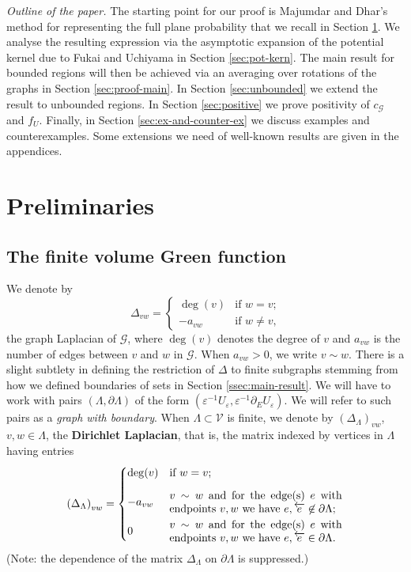 \documentclass[11pt]{article}
\theoremstyle{remark}
\def\eps{\varepsilon}
\def\cG{\mathcal{G}}
\def\cV{\mathcal{V}}
\newcommand{\eqnst}[1]{\begin{equation*}#1\end{equation*}}
\begin{document}
\emph{Outline of the paper.} 
The starting point for our proof is Majumdar and Dhar's method \cite{Majumdar1992,Dhar1991} 
for representing the full plane probability that we recall in Section \ref{sec:prelim}. 
We analyse the resulting expression via the asymptotic 
expansion of the potential kernel due to Fukai and Uchiyama \cite{FU96} in 
Section \ref{sec:pot-kern}.
The main result for bounded regions will then be achieved via an averaging over 
rotations of the graphs in Section \ref{sec:proof-main}. In Section \ref{sec:unbounded} 
we extend the result to unbounded regions. In Section \ref{sec:positive} we prove positivity
of $c_\cG$ and $f_U$. Finally, in Section \ref{sec:ex-and-counter-ex} 
we discuss examples and counterexamples. Some extensions we need of well-known results 
are given in the appendices.


\section{Preliminaries}
\label{sec:prelim}


\subsection{The finite volume Green function}
\label{ssec:finite-Green}
We denote by 
\eqnst{
  \Delta_{vw}
  = \begin{cases}
    \deg(v) & \text{if $w = v$;} \\
    - a_{vw} & \text{if $w \not= v$,}
  \end{cases} }
the graph Laplacian of $\cG$, where $\deg(v)$ denotes the degree of $v$ and $a_{vw}$ 
is the number of edges between $v$ and $w$ in $\cG$. When $a_{vw} > 0$, we write $v \sim w$.
There is a slight subtlety in defining the restriction of $\Delta$ to finite subgraphs
stemming from how we defined boundaries of sets in Section \ref{ssec:main-result}. 
We will have to work with pairs $(\Lambda, \partial \Lambda)$ of the form
$(\eps^{-1} U_\eps, \eps^{-1} \partial_E U_\eps)$. We will refer to such pairs as a
\emph{graph with boundary}. When $\Lambda \subset \cV$ is 
finite, we denote by $\left( \Delta_\Lambda \right)_{vw}$, $v,w \in \Lambda$, the 
\textbf{Dirichlet Laplacian}, that is, the matrix indexed by vertices in $\Lambda$ 
having entries
\[ \left( \Delta_\Lambda \right)_{vw}
   = \begin{cases}
     \deg(v) & \text{if $w=v$;} \\[2ex]
     - a_{vw} & \parbox{5.5cm}{$v \sim w$ and for the edge(s) $e$ with endpoints $v,w$ 
        we have $e, \overleftarrow{e} \not\in \partial \Lambda$;} \\[2ex]
     0    & \parbox{5.5cm}{$v \sim w$ and for the edge(s) $e$ with endpoints $v,w$ 
        we have $e, \overleftarrow{e} \in \partial \Lambda$.}
   \end{cases} \]
(Note: the dependence of the matrix $\Delta_\Lambda$ on $\partial \Lambda$ is suppressed.)
\end{document}
